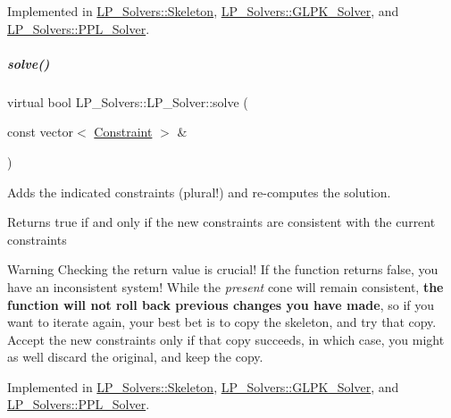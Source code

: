 Implemented in \hyperlink{group___c_l_s_solvers_a202b0b37e0ea8a817ce6e29c93a39cd8}{L\+P\+\_\+\+Solvers\+::\+Skeleton}, \hyperlink{group___c_l_s_solvers_a544cb09dfa211fae9adaacfd402af9a2}{L\+P\+\_\+\+Solvers\+::\+G\+L\+P\+K\+\_\+\+Solver}, and \hyperlink{group___c_l_s_solvers_affe1dce30ec7bad7c54e4edf9283235e}{L\+P\+\_\+\+Solvers\+::\+P\+P\+L\+\_\+\+Solver}.

\mbox{\label{group___c_l_s_solvers_aea1a5bf98a2c4c06b0550cacdf8b88fd}} 
\subparagraph{\texorpdfstring{solve()}{solve()}\hspace{0.1cm}{\footnotesize\ttfamily [2/2]}}
{\footnotesize\ttfamily virtual bool L\+P\+\_\+\+Solvers\+::\+L\+P\+\_\+\+Solver\+::solve (\begin{DoxyParamCaption}\item[{const vector$<$ \hyperlink{group___c_l_s_solvers_class_l_p___solvers_1_1_constraint}{Constraint} $>$ \&}]{ }\end{DoxyParamCaption})\hspace{0.3cm}{\ttfamily [pure virtual]}}



Adds the indicated constraints (plural!) and re-\/computes the solution. 

\begin{DoxyReturn}{Returns}
{\ttfamily true} if and only if the new constraints are consistent with the current constraints
\end{DoxyReturn}
\begin{DoxyWarning}{Warning}
Checking the return value is crucial! If the function returns {\ttfamily false}, you have an inconsistent system! While the {\itshape present} cone will remain consistent, {\bfseries the function will not roll back previous changes you have made}, so if you want to iterate again, your best bet is to copy the skeleton, and try that copy. Accept the new constraints only if that copy succeeds, in which case, you might as well discard the original, and keep the copy. 
\end{DoxyWarning}


Implemented in \hyperlink{group___c_l_s_solvers_aba082a338a2cb3ace612fd2dfba667c5}{L\+P\+\_\+\+Solvers\+::\+Skeleton}, \hyperlink{group___c_l_s_solvers_a1ceccb6fc4eff73cc4237c46ab9e7699}{L\+P\+\_\+\+Solvers\+::\+G\+L\+P\+K\+\_\+\+Solver}, and \hyperlink{group___c_l_s_solvers_a6f73ee7b0d42f78fd95e399c474b3eb4}{L\+P\+\_\+\+Solvers\+::\+P\+P\+L\+\_\+\+Solver}.



